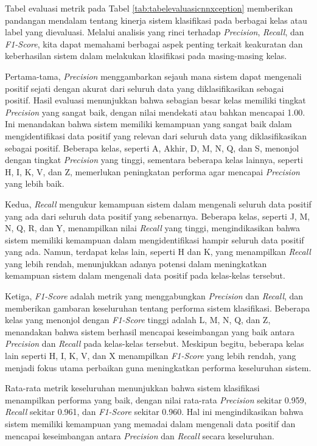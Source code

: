 Tabel evaluasi metrik pada Tabel \ref{tab:tabelevaluasicnnxception} memberikan pandangan mendalam tentang kinerja sistem klasifikasi pada berbagai kelas atau label yang dievaluasi. Melalui analisis yang rinci terhadap \textit{Precision}, \textit{Recall}, dan \textit{F1-Score}, kita dapat memahami berbagai aspek penting terkait keakuratan dan keberhasilan sistem dalam melakukan klasifikasi pada masing-masing kelas.

Pertama-tama, \textit{Precision} menggambarkan sejauh mana sistem dapat mengenali positif sejati dengan akurat dari seluruh data yang diklasifikasikan sebagai positif. Hasil evaluasi menunjukkan bahwa sebagian besar kelas memiliki tingkat \textit{Precision} yang sangat baik, dengan nilai mendekati atau bahkan mencapai 1.00. Ini menandakan bahwa sistem memiliki kemampuan yang sangat baik dalam mengidentifikasi data positif yang relevan dari seluruh data yang diklasifikasikan sebagai positif. Beberapa kelas, seperti A, Akhir, D, M, N, Q, dan S, menonjol dengan tingkat \textit{Precision} yang tinggi, sementara beberapa kelas lainnya, seperti H, I, K, V, dan Z, memerlukan peningkatan performa agar mencapai \textit{Precision} yang lebih baik.

Kedua, \textit{Recall} mengukur kemampuan sistem dalam mengenali seluruh data positif yang ada dari seluruh data positif yang sebenarnya. Beberapa kelas, seperti J, M, N, Q, R, dan Y, menampilkan nilai \textit{Recall} yang tinggi, mengindikasikan bahwa sistem memiliki kemampuan dalam mengidentifikasi hampir seluruh data positif yang ada. Namun, terdapat kelas lain, seperti H dan K, yang menampilkan \textit{Recall} yang lebih rendah, menunjukkan adanya potensi dalam meningkatkan kemampuan sistem dalam mengenali data positif pada kelas-kelas tersebut.

Ketiga, \textit{F1-Score} adalah metrik yang menggabungkan \textit{Precision} dan \textit{Recall}, dan memberikan gambaran keseluruhan tentang performa sistem klasifikasi. Beberapa kelas yang menonjol dengan \textit{F1-Score} tinggi adalah L, M, N, Q, dan Z, menandakan bahwa sistem berhasil mencapai keseimbangan yang baik antara \textit{Precision} dan \textit{Recall} pada kelas-kelas tersebut. Meskipun begitu, beberapa kelas lain seperti H, I, K, V, dan X menampilkan \textit{F1-Score} yang lebih rendah, yang menjadi fokus utama perbaikan guna meningkatkan performa keseluruhan sistem.

Rata-rata metrik keseluruhan menunjukkan bahwa sistem klasifikasi menampilkan performa yang baik, dengan nilai rata-rata \textit{Precision} sekitar 0.959, \textit{Recall} sekitar 0.961, dan \textit{F1-Score} sekitar 0.960. Hal ini mengindikasikan bahwa sistem memiliki kemampuan yang memadai dalam mengenali data positif dan mencapai keseimbangan antara \textit{Precision} dan \textit{Recall} secara keseluruhan.

